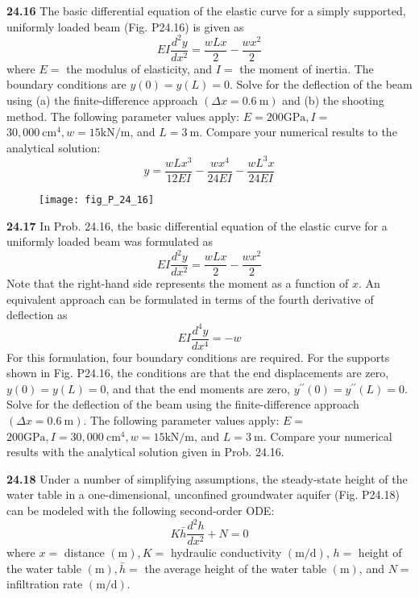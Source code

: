 \documentclass[../main.tex]{subfiles}
\begin{document}
\begin{multicols}{2}
    \noindent\textbf{24.16} The basic differential equation of the elastic curve for a simply supported, uniformly loaded beam (Fig. P24.16) is given as
    $$
    E I \frac{d^{2} y}{d x^{2}}=\frac{w L x}{2}-\frac{w x^{2}}{2}
    $$
    where $E=$ the modulus of elasticity, and $I=$ the moment of inertia. The boundary conditions are $y(0)=y(L)=0$. Solve for the deflection of the beam using (a) the finite-difference approach $(\Delta x=0.6 \mathrm{~m})$ and (b) the shooting method. The following parameter values apply: $E=200 \mathrm{GPa}, I=$ $30,000 \mathrm{~cm}^{4}, w=15 \mathrm{kN} / \mathrm{m}$, and $L=3 \mathrm{~m}$. Compare your numerical results to the analytical solution:
    $$
    y=\frac{w L x^{3}}{12 E I}-\frac{w x^{4}}{24 E I}-\frac{w L^{3} x}{24 E I}
    $$
    \begin{figure}[H]
        \centering
        \texttt{[image: fig\_P\_24\_16]}
        \caption{}
       \label{fig:fig_P_24_16} %
    \end{figure}\vspace{2mm}

    \noindent\textbf{24.17} In Prob. 24.16, the basic differential equation of the elastic curve for a uniformly loaded beam was formulated as
    $$
    E I \frac{d^{2} y}{d x^{2}}=\frac{w L x}{2}-\frac{w x^{2}}{2}
    $$
    Note that the right-hand side represents the moment as a function of $x$. An equivalent approach can be formulated in terms of the fourth derivative of deflection as
    $$
    E I \frac{d^{4} y}{d x^{4}}=-w
    $$
    For this formulation, four boundary conditions are required. For the supports shown in Fig. P24.16, the conditions are that the end displacements are zero, $y(0)=y(L)=0$, and that the end moments are zero, $y^{\prime \prime}(0)=y^{\prime \prime}(L)=0$.
    Solve for the deflection of the beam using the finite-difference approach $(\Delta x=0.6 \mathrm{~m})$. The following parameter values apply: $E=$ $200 \mathrm{GPa}, I=30,000 \mathrm{~cm}^{4}, w=15 \mathrm{kN} / \mathrm{m}$, and $L=3 \mathrm{~m}$. Compare your numerical results with the analytical solution given in Prob. 24.16.\vspace{2mm}

    \noindent\textbf{24.18} Under a number of simplifying assumptions, the steady-state height of the water table in a one-dimensional, unconfined groundwater aquifer (Fig. P24.18) can be modeled with the following second-order ODE:
    $$
    K \bar{h} \frac{d^{2} h}{d x^{2}}+N=0
    $$
    where $x=$ distance $(\mathrm{m}), K=$ hydraulic conductivity $(\mathrm{m} / \mathrm{d})$, $h=$ height of the water table $(\mathrm{m}), \bar{h}=$ the average height of the water table $(\mathrm{m})$, and $N=$ infiltration rate $(\mathrm{m} / \mathrm{d})$.
    

\end{multicols}
\end{document}
